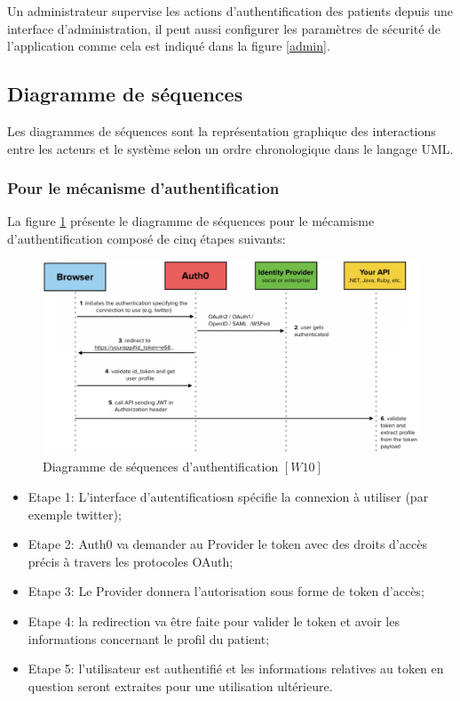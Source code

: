 Un administrateur supervise les actions d’authentification des patients depuis une interface d’administration, il peut aussi configurer les paramètres de sécurité de l’application comme cela est indiqué dans la figure \ref{admin}.

\subsection{Diagramme de séquences}

Les diagrammes de séquences sont la représentation graphique des interactions entre les acteurs et le système selon un ordre chronologique dans le langage UML.

\subsubsection{Pour le mécanisme d'authentification}

La figure \ref{seq} présente le diagramme de séquences pour le mécamisme d'authentification composé de cinq étapes suivants:

\vspace{6pt}
\paragraphmark

\begin{figure}[!ht]
\begin{center}
\includegraphics[scale=0.42]{seq.jpg}
\caption{Diagramme de séquences d'authentification $[W10]$}
\label{seq}
\end{center}
\end{figure}

\begin{itemize}
	\item Etape 1: L'interface d'autentificatiosn spécifie la connexion à utiliser (par exemple twitter);
	\item Etape 2: Auth0 va demander au Provider le token avec des droits d’accès précis à travers les protocoles OAuth;
	\item Etape 3: Le Provider donnera l’autorisation sous forme de token d'accès;
	\item Etape 4: la redirection va être faite pour valider le token et avoir les informations concernant le profil du patient;
	\item Etape 5: l’utilisateur est authentifié et les informations relatives au token en question seront extraites pour une utilisation ultérieure.
\end{itemize}

